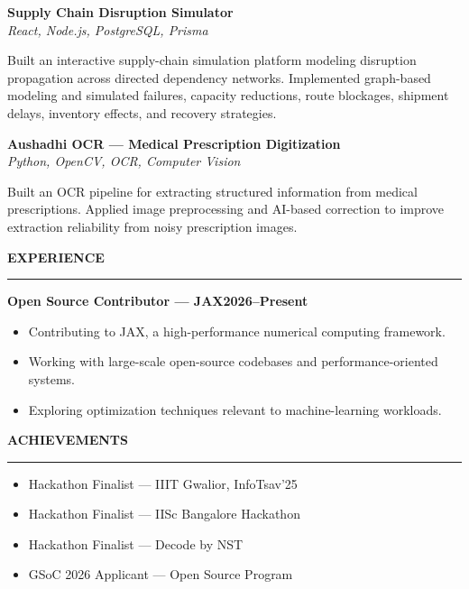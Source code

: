 \documentclass[10pt,letterpaper]{article}
\newcommand{\resumeSection}[1]{%
  \vspace{4.2pt}%
  {\bfseries\large #1}\par
  \vspace{1.2pt}\hrule\vspace{3.2pt}%
}
\begin{document}
\textbf{Supply Chain Disruption Simulator}\\[-1pt]
{\small\textit{React, Node.js, PostgreSQL, Prisma}}\par
{\small Built an interactive supply-chain simulation platform modeling disruption propagation across directed dependency networks. Implemented graph-based modeling and simulated failures, capacity reductions, route blockages, shipment delays, inventory effects, and recovery strategies.}\par
\vspace{2.4pt}

\textbf{Aushadhi OCR --- Medical Prescription Digitization}\\[-1pt]
{\small\textit{Python, OpenCV, OCR, Computer Vision}}\par
{\small Built an OCR pipeline for extracting structured information from medical prescriptions. Applied image preprocessing and AI-based correction to improve extraction reliability from noisy prescription images.}

\resumeSection{EXPERIENCE}
\textbf{Open Source Contributor --- JAX}\hfill\textbf{2026--Present}
\begin{itemize}
  \item {\small Contributing to JAX, a high-performance numerical computing framework.}
  \item {\small Working with large-scale open-source codebases and performance-oriented systems.}
  \item {\small Exploring optimization techniques relevant to machine-learning workloads.}
\end{itemize}

\resumeSection{ACHIEVEMENTS}
\begin{itemize}
  \item {\small Hackathon Finalist --- IIIT Gwalior, InfoTsav'25}
  \item {\small Hackathon Finalist --- IISc Bangalore Hackathon}
  \item {\small Hackathon Finalist --- Decode by NST}
  \item {\small GSoC 2026 Applicant --- Open Source Program}
\end{itemize}
\end{document}
